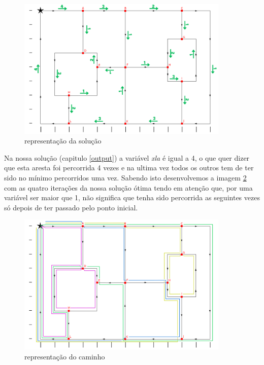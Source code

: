 \documentclass[a4paper]{report}
\begin{document}
\begin{figure}[H]
    \begin{center}
        \includegraphics[width=0.9\textwidth]{images/desafioVisited.png}\par
        \caption{representação da solução}
        \label{fig:visited}
    \end{center}
\end{figure}

Na nossa solução (capitulo \ref{output}) a variável \textit{xla} é igual a 4, o
que quer dizer que esta aresta foi percorrida 4 vezes e na ultima vez todos os
outros tem de ter sido no mínimo percorridos uma vez. Sabendo isto desenvolvemos
a imagem \ref{fig:path} com as quatro iterações da nossa solução ótima tendo em
atenção que, por uma variável ser maior que 1, não significa que tenha sido
percorrida as seguintes vezes só depois de ter passado pelo ponto inicial.

\begin{figure}[H]
    \begin{center}
        \includegraphics[width=0.9\textwidth]{images/desafioSolucao.png}\par
        \caption{representação do caminho}
        \label{fig:path}
    \end{center}
\end{figure}
\end{document}
